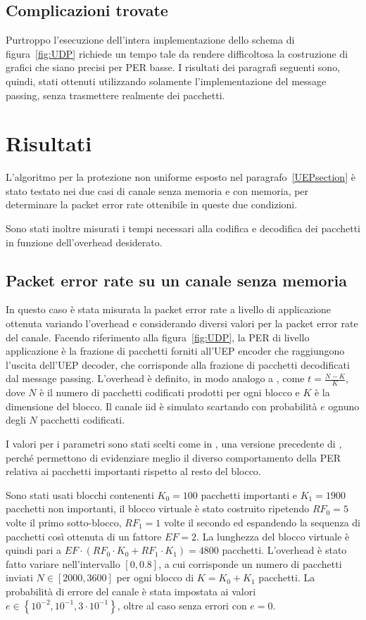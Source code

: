 \documentclass[italian, a4paper, 12pt]{article}
\begin{document}
\subsection{Complicazioni trovate} %
Purtroppo l'esecuzione dell'intera implementazione dello schema di
figura~\ref{fig:UDP} richiede un tempo tale da rendere difficoltosa la
costruzione di grafici che siano precisi per PER basse.
%
I risultati dei paragrafi seguenti sono, quindi, stati ottenuti
utilizzando solamente l'implementazione del message passing, senza
trasmettere realmente dei pacchetti.

\section{Risultati} %
L'algoritmo per la protezione non uniforme esposto nel
paragrafo~\ref{UEPsection} è stato testato nei due casi di canale
senza memoria e con memoria, per determinare la packet error
rate ottenibile in queste due condizioni.

Sono stati inoltre misurati i tempi necessari alla codifica e
decodifica dei pacchetti in funzione dell'overhead desiderato.

\subsection{Packet error rate su un canale senza memoria}
In questo caso è stata misurata la packet error rate a livello di
applicazione ottenuta variando l'overhead e considerando diversi
valori per la packet error rate del canale.
%
Facendo riferimento alla figura~\ref{fig:UDP}, la PER di livello
applicazione è la frazione di pacchetti forniti all'UEP encoder che
raggiungono l'uscita dell'UEP decoder, che corrisponde alla frazione
di pacchetti decodificati dal message passing.
%
L'overhead è definito, in modo analogo a \cite{uep}, come $t =
\frac{N-K}{K}$, dove $N$ è il numero di pacchetti codificati prodotti
per ogni blocco e $K$ è la dimensione del blocco.
%
Il canale iid è simulato scartando con probabilità $e$ ognuno degli
$N$ pacchetti codificati.

I valori per i parametri sono stati scelti come in \cite{uepother},
una versione precedente di \cite{uep}, perché permettono di
evidenziare meglio il diverso comportamento della PER relativa ai
pacchetti importanti rispetto al resto del blocco.

Sono stati usati blocchi contenenti $K_0 = 100$ pacchetti importanti e
$K_1 = 1900$ pacchetti non importanti, il blocco virtuale è stato
costruito ripetendo $RF_0 = 5$ volte il primo sotto-blocco, $RF_1 = 1$
volte il secondo ed espandendo la sequenza di pacchetti così ottenuta
di un fattore $EF = 2$. La lunghezza del blocco virtuale è quindi pari
a $EF \cdot \left( RF_0 \cdot K_0 + RF_1 \cdot K_1 \right) = 4800$
pacchetti.
%
L'overhead è stato fatto variare nell'intervallo $[0, 0.8]$, a cui
corrisponde un numero di pacchetti inviati $N \in [2000, 3600]$ per
ogni blocco di $K=K_0+K_1$ pacchetti.
%
La probabilità di errore del canale è stata impostata ai valori $e \in
\left\{10^{-2}, 10^{-1}, 3 \cdot 10^{-1} \right\}$, oltre al caso
senza errori con $e=0$.
\end{document}

